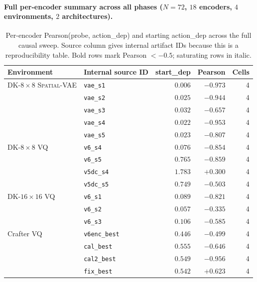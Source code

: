 \documentclass{article}
\newcommand{\encSpatialVAE}{\textsc{Spatial-VAE}}
\begin{document}
\paragraph{Full per-encoder summary across all phases ($N{=}72$, $18$ encoders, $4$ environments, $2$ architectures).}

\begin{table}[h]
  \centering
  \footnotesize
  \caption{Per-encoder Pearson(probe, action\_dep) and starting action\_dep across the full causal sweep. Source column gives internal artifact IDs because this is a reproducibility table. Bold rows mark Pearson $<-0.5$; saturating rows in italic.}
  \label{tab:full-causal}
  \begin{tabular}{l l r r r}
    \toprule
    Environment & Internal source ID & start\_dep & Pearson & Cells \\
    \midrule
    DK-$8\times8$ \encSpatialVAE{} & \texttt{vae\_s1} & $0.006$ & $\mathbf{-0.973}$ & 4 \\
    & \texttt{vae\_s2} & $0.025$ & $\mathbf{-0.944}$ & 4 \\
    & \texttt{vae\_s3} & $0.032$ & $\mathbf{-0.657}$ & 4 \\
    & \texttt{vae\_s4} & $0.022$ & $\mathbf{-0.953}$ & 4 \\
    & \texttt{vae\_s5} & $0.023$ & $\mathbf{-0.807}$ & 4 \\
    \midrule
    DK-$8\times8$ VQ  & \texttt{v6\_s4}   & $0.076$ & $\mathbf{-0.854}$ & 4 \\
    & \texttt{v6\_s5}   & $0.765$ & $\mathbf{-0.859}$ & 4 \\
    & \texttt{v5dc\_s4} & $1.783$ & \emph{$+0.300$} & 4 \\
    & \texttt{v5dc\_s5} & $0.749$ & $\mathbf{-0.503}$ & 4 \\
    \midrule
    DK-$16\times16$ VQ & \texttt{v6\_s1}  & $0.089$ & $\mathbf{-0.821}$ & 4 \\
    & \texttt{v6\_s2}  & $0.057$ & \emph{$-0.335$} & 4 \\
    & \texttt{v6\_s3}  & $0.106$ & $\mathbf{-0.585}$ & 4 \\
    \midrule
    Crafter VQ & \texttt{v6enc\_best}      & $0.446$ & \emph{$-0.499$} & 4 \\
    & \texttt{cal\_best}        & $0.555$ & $\mathbf{-0.646}$ & 4 \\
    & \texttt{cal2\_best}       & $0.549$ & $\mathbf{-0.956}$ & 4 \\
    & \texttt{fix\_best}        & $0.542$ & \emph{$+0.623$} & 4 \\

\end{tabular}
\end{table}
\end{document}
